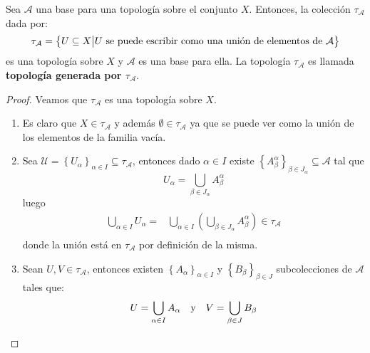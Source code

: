 \documentclass[12pt]{report}
\theoremstyle{largebreak}
\begin{document}
    \begin{propo}
        Sea $\mathcal{A}$ una base para una topología sobre el conjunto $X$. Entonces, la colección $\tau_{\mathcal{A}}$ dada por:
        \begin{equation*}
            \tau_{\mathcal{A}}=\left\{U\subseteq X\big| U\textup{ se puede escribir como una unión de elementos de }\mathcal{A} \right\}
        \end{equation*}
        es una topología sobre $X$ y $\mathcal{A}$ es una base para ella. La topología $\tau_{\mathcal{A}}$ es llamada \textbf{topología generada por $\tau_{\mathcal{A}}$}.
    \end{propo}

    \begin{proof}
        Veamos que $\tau_{\mathcal{A}}$ es una topología sobre $X$.
        \begin{enumerate}
            \item Es claro que $X\in\tau_{\mathcal{A}}$ y además $\emptyset\in\tau_{\mathcal{A}}$ ya que se puede ver como la unión de los elementos de la familia vacía.
            \item Sea $\mathcal{U}=\left\{U_\alpha\right\}_{\alpha\in I} \subseteq\mathcal{\tau_{\mathcal{A}}}$, entonces dado $\alpha\in I$ existe $\left\{A^\alpha_\beta\right\}_{\beta\in J_\alpha}\subseteq\mathcal{A}$ tal que
            \begin{equation*}
                U_\alpha=\bigcup_{\beta\in J_\alpha}A^\alpha_\beta
            \end{equation*}
            luego
            \begin{equation*}
                \begin{split}
                    \bigcup_{\alpha\in I}U_\alpha=&\bigcup_{\alpha\in I}\left(\bigcup_{\beta\in J_\alpha}A^\alpha_\beta \right)\in\tau_{\mathcal{A}} \\
                \end{split}
            \end{equation*}
            donde la unión está en $\tau_{\mathcal{A}}$ por definición de la misma.
            \item Sean $U,V\in\tau_{\mathcal{A}}$, entonces existen $\left\{A_\alpha \right\}_{\alpha\in I}$ y $\left\{B_\beta\right\}_{\beta\in J}$ subcolecciones de $\mathcal{A}$ tales que:
            \begin{equation*}
                U=\bigcup_{\alpha\in I}A_\alpha\quad \textup{y}\quad V=\bigcup_{\beta\in J}B_\beta
            \end{equation*}

\end{enumerate}
\end{proof}
\end{document}
